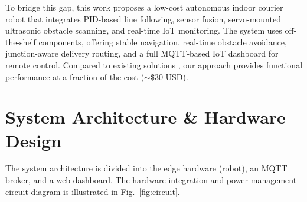 \documentclass[conference]{IEEEtran}
\begin{document}
To bridge this gap, this work proposes a low-cost autonomous indoor courier robot that integrates PID-based line following, sensor fusion, servo-mounted ultrasonic obstacle scanning, and real-time IoT monitoring. The system uses off-the-shelf components, offering stable navigation, real-time obstacle avoidance, junction-aware delivery routing, and a full MQTT-based IoT dashboard for remote control. Compared to existing solutions \cite{ref1,ref4,ref7}, our approach provides functional performance at a fraction of the cost ($\sim$\$30 USD).

\section{System Architecture \& Hardware Design}

The system architecture is divided into the edge hardware (robot), an MQTT broker, and a web dashboard. The hardware integration and power management circuit diagram is illustrated in Fig.~\ref{fig:circuit}.
\end{document}
